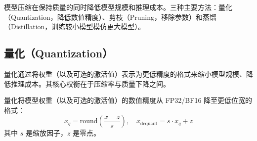 模型压缩在保持质量的同时降低模型规模和推理成本。三种主要方法：量化（Quantization，降低数值精度）、剪枝（Pruning，移除参数）和蒸馏（Distillation，训练较小模型模仿更大模型）。

\subsection{量化（Quantization）}
\label{quantization}

量化通过将权重（以及可选的激活值）表示为更低精度的格式来缩小模型规模、降低推理成本。其核心权衡在于压缩率与质量下降之间。

\begin{keybox}[量化概览]
量化将模型权重（以及可选的激活值）的数值精度从 FP32/BF16 降至更低位宽的格式：
\[
x_q = \text{round}\!\left(\frac{x - z}{s}\right), \quad x_{\text{dequant}} = s \cdot x_q + z
\]
其中 $s$ 是缩放因子，$z$ 是零点。
\end{keybox}

